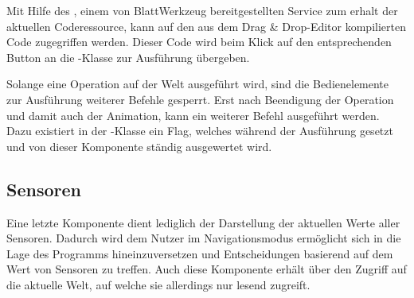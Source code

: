 Mit Hilfe des , einem von BlattWerkzeug bereitgestellten Service zum erhalt der aktuellen Coderessource, kann auf den aus dem Drag \& Drop-Editor kompilierten Code zugegriffen werden. Dieser Code wird beim Klick auf den entsprechenden Button an die -Klasse zur Ausführung übergeben.

Solange eine Operation auf der Welt ausgeführt wird, sind die Bedienelemente zur Ausführung weiterer Befehle gesperrt. Erst nach Beendigung der Operation und damit auch der Animation, kann ein weiterer Befehl ausgeführt werden. Dazu existiert in der -Klasse ein Flag, welches während der Ausführung gesetzt und von dieser Komponente ständig ausgewertet wird.

\subsection{Sensoren}
\label{sec:implementation:integration:sensors}

Eine letzte Komponente dient lediglich der Darstellung der aktuellen Werte aller Sensoren. Dadurch wird dem Nutzer im Navigationsmodus ermöglicht sich in die Lage des Programms hineinzuversetzen und Entscheidungen basierend auf dem Wert von Sensoren zu treffen. Auch diese Komponente erhält über den  Zugriff auf die aktuelle Welt, auf welche sie allerdings nur lesend zugreift.
